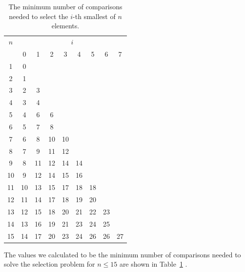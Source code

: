 \documentclass[10pt,journal,compsoc]{IEEEtran}
\begin{document}
\begin{table}[!t]
  \renewcommand{\arraystretch}{1.2}
  \caption{The minimum number of comparisons needed to select the $i$-th smallest of $n$ elements.}
  \label{table:num-comparisons}
  \centering
  \begin{tabular}{c|cccccccc}
    $n$ & \multicolumn{8}{c}{$i$}                                    \\
        & 0                       & 1  & 2  & 3  & 4  & 5  & 6  & 7  \\ \hline
    1   & 0                                                          \\
    2   & 1                                                          \\
    3   & 2                       & 3                                \\
    4   & 3                       & 4                                \\
    5   & 4                       & 6  & 6                           \\
    6   & 5                       & 7  & 8                           \\
    7   & 6                       & 8  & 10 & 10                     \\
    8   & 7                       & 9  & 11 & 12                     \\
    9   & 8                       & 11 & 12 & 14 & 14                \\
    10  & 9                       & 12 & 14 & 15 & 16                \\
    11  & 10                      & 13 & 15 & 17 & 18 & 18           \\
    12  & 11                      & 14 & 17 & 18 & 19 & 20           \\
    13  & 12                      & 15 & 18 & 20 & 21 & 22 & 23      \\
    14  & 13                      & 16 & 19 & 21 & 23 & 24 & 25      \\
    15  & 14                      & 17 & 20 & 23 & 24 & 26 & 26 & 27 \\
  \end{tabular}
\end{table}

The values we calculated to be the minimum number of comparisons needed to solve the selection problem for $n \leq 15$ are shown in Table~\ref{table:num-comparisons} .
\end{document}
